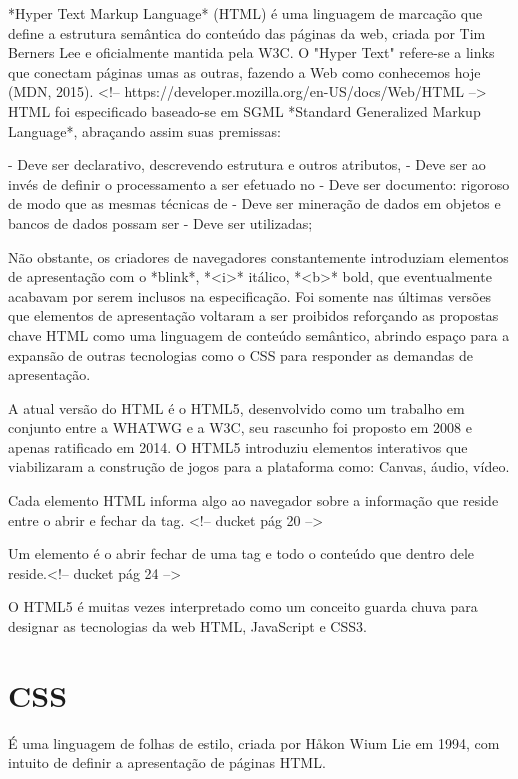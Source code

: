 \documentclass[11pt,a4paper]{article}
\begin{document}
*Hyper Text Markup Language* (HTML) é uma linguagem de marcação
que define a estrutura semântica do conteúdo das páginas da
web, criada por Tim Berners Lee e oficialmente mantida pela W3C.
O "Hyper Text" refere-se a links que conectam páginas umas as
outras, fazendo a Web como conhecemos hoje (MDN, 2015). <!--
https://developer.mozilla.org/en-US/docs/Web/HTML --> HTML foi
especificado baseado-se em SGML *Standard Generalized Markup Language*,
abraçando assim suas premissas:

- Deve ser declarativo, descrevendo estrutura e outros atributos,
- Deve ser ao invés de definir o processamento a ser efetuado no
- Deve ser documento: rigoroso de modo que as mesmas técnicas de
- Deve ser mineração de dados em objetos e bancos de dados possam ser
- Deve ser utilizadas;

Não obstante, os criadores de navegadores constantemente introduziam
elementos de apresentação com o *blink*, *<i>* itálico, *<b>* bold,
que eventualmente acabavam por serem inclusos na especificação. Foi
somente nas últimas versões que elementos de apresentação voltaram
a ser proibidos reforçando as propostas chave HTML como uma linguagem
de conteúdo semântico, abrindo espaço para a expansão de outras
tecnologias como o CSS para responder as demandas de apresentação.

A atual versão do HTML é o HTML5, desenvolvido como um trabalho em
conjunto entre a WHATWG e a W3C, seu rascunho foi proposto em 2008 e
apenas ratificado em 2014. O HTML5 introduziu elementos interativos que
viabilizaram a construção de jogos para a plataforma como: Canvas,
áudio, vídeo.

Cada elemento HTML informa algo ao navegador sobre a informação que
reside entre o abrir e fechar da tag. <!-- ducket pág 20 -->

Um elemento é o abrir fechar de uma tag e todo o conteúdo que dentro
dele reside.<!-- ducket pág 24 -->

O HTML5 é muitas vezes interpretado como um conceito guarda chuva para
designar as tecnologias da web HTML, JavaScript e CSS3.


\section{CSS}

É uma linguagem de folhas de estilo, criada por Håkon Wium Lie em
1994, com intuito de definir a apresentação de páginas HTML.
\end{document}
